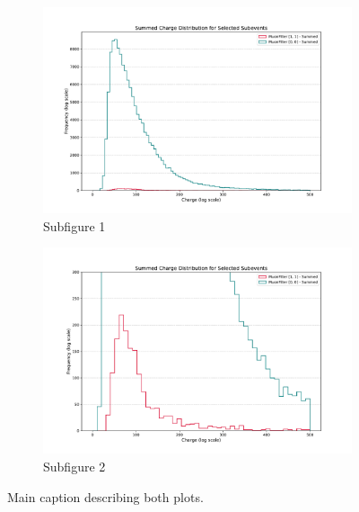 \begin{figure}[H] %
    \centering
    \begin{subfigure}{0.49\textwidth}
        \centering
        \includegraphics[width=\textwidth]{Plots/frt_muon_filter_sub_lin.pdf}
        \caption{Subfigure 1}
        \label{fig:sub1}
    \end{subfigure}
    \hfill %
    \begin{subfigure}{0.49\textwidth}
        \centering
        \includegraphics[width=\textwidth]{Plots/frt_muon_filter_sub_mod1.pdf}
        \caption{Subfigure 2}
        \label{fig:sub2}
    \end{subfigure}
    \caption{Main caption describing both plots.}
    \label{fig:frt_mu_sub_comp}
\end{figure}

